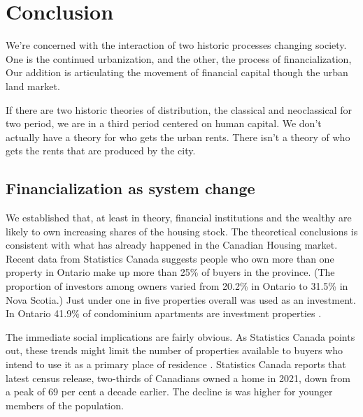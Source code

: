 \chapter{Conclusion} \label{chapter-conclusions}
We're concerned with the interaction of two historic processes changing society. One is the continued urbanization, and the other, the process of financialization, 
Our addition is articulating the movement of financial capital though the urban land market. 

If there are two historic theories of distribution, the classical and neoclassical for two period, we are in a third period centered on human capital. 
We don't actually have a theory for who gets the urban rents. 
There isn't %
a theory of who gets the rents that are produced by the city. 

\section{Financialization as system change} \label{section-system}
We established that, at least in theory, financial institutions and the wealthy are likely to own increasing shares of the housing stock. The theoretical conclusions is consistent with what has already happened in the Canadian Housing market. Recent data from Statistics Canada \cite{fontaineResidentialRealEstate2023} suggests people who own more than one property in Ontario make up more than 25\% of buyers in the province. (The proportion of investors among owners varied from 20.2\% in Ontario to 31.5\% in Nova Scotia.)
Just under one in five properties overall was used as an investment.
In Ontario 41.9\% of condominium apartments are investment properties \cite{statisticscanadaBuyRentHousing2022}.

The immediate social implications are fairly obvious. As Statistics Canada points out, these trends might limit the number of properties available to buyers who intend to use it as a primary place of residence  \cite{fontaineResidentialRealEstate2023}. Statistics Canada reports that latest census release, two-thirds of Canadians owned a home in 2021, down from a peak of 69 per cent a decade earlier. The decline is was higher for younger members of the population. 

